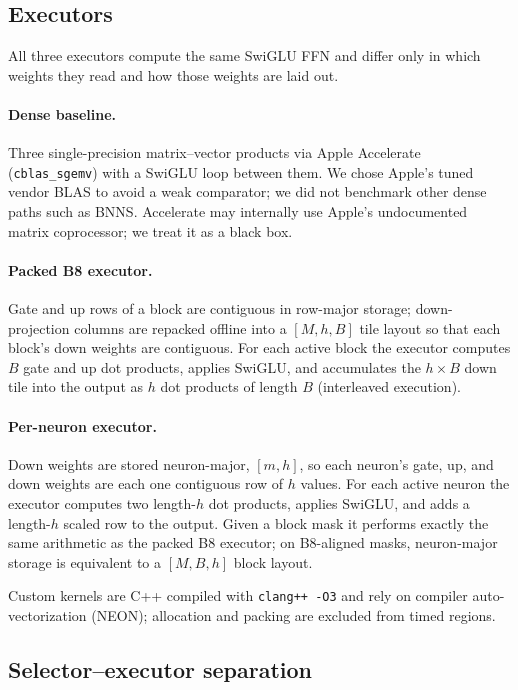 \subsection{Executors}

All three executors compute the same SwiGLU FFN and differ only in which
weights they read and how those weights are laid out.

\paragraph{Dense baseline.} Three single-precision matrix--vector products via
Apple Accelerate (\texttt{cblas\_sgemv}) with a SwiGLU loop between them. We
chose Apple's tuned vendor BLAS to avoid a weak comparator; we did not
benchmark other dense paths such as BNNS. Accelerate may internally use
Apple's undocumented matrix coprocessor; we treat it as a black box.

\paragraph{Packed B8 executor.} Gate and up rows of a block are contiguous in
row-major storage; down-projection columns are repacked offline into a
$[M,h,B]$ tile layout so that each block's down weights are contiguous. For
each active block the executor computes $B$ gate and up dot products, applies
SwiGLU, and accumulates the $h\times B$ down tile into the output as $h$ dot
products of length $B$ (interleaved execution).

\paragraph{Per-neuron executor.} Down weights are stored neuron-major,
$[m,h]$, so each neuron's gate, up, and down weights are each one contiguous
row of $h$ values. For each active neuron the executor computes two length-$h$
dot products, applies SwiGLU, and adds a length-$h$ scaled row to the output.
Given a block mask it performs exactly the same arithmetic as the packed B8
executor; on B8-aligned masks, neuron-major storage is equivalent to a
$[M,B,h]$ block layout.

Custom kernels are C++ compiled with \texttt{clang++ -O3} and rely on compiler
auto-vectorization (NEON); allocation and packing are excluded from timed
regions.

\subsection{Selector--executor separation}

